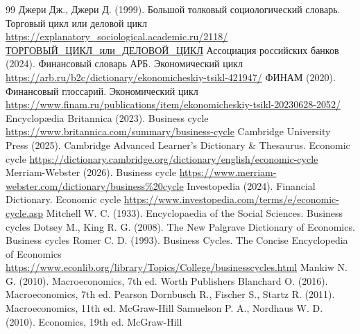 
\begin{RaggedRight}
\begin{thebibliography}{99} %
     \hypertarget{bib:Джери-1999}{} Джери Дж., Джери Д. (1999). Большой толковый социологический словарь. Торговый цикл или деловой цикл \url{https://explanatory_sociological.academic.ru/2118/ТОРГОВЫЙ_ЦИКЛ_или_ДЕЛОВОЙ_ЦИКЛ}
     \hypertarget{bib:АРБ-2024}{} Ассоциация российских банков (2024). Финансовый словарь АРБ. Экономический цикл \url{https://arb.ru/b2c/dictionary/ekonomicheskiy-tsikl-421947/}
     \hypertarget{bib:ФИНАМ-2020}{} ФИНАМ (2020). Финансовый глоссарий. Экономический цикл \url{https://www.finam.ru/publications/item/ekonomicheskiy-tsikl-20230628-2052/}
     \hypertarget{bib:Britannica-2023}{} Encyclopædia Britannica (2023). Business cycle \url{https://www.britannica.com/summary/business-cycle}
     \hypertarget{bib:Cambridge-2025}{} Cambridge University Press (2025). Cambridge Advanced Learner’s Dictionary \& Thesaurus. Economic cycle \url{https://dictionary.cambridge.org/dictionary/english/economic-cycle}
     \hypertarget{bib:Merriam-Webster-2026}{} Merriam-Webster (2026). Business cycle \url{https://www.merriam-webster.com/dictionary/business%20cycle}
     \hypertarget{bib:Investopedia-2024}{} Investopedia (2024). Financial Dictionary. Economic cycle \url{https://www.investopedia.com/terms/e/economic-cycle.asp}
     \hypertarget{bib:Mitchell-1933}{} Mitchell W. C. (1933). Encyclopaedia of the Social Sciences. Business cycles
     \hypertarget{bib:Dotsey-2008}{} Dotsey M., King R. G. (2008). The New Palgrave Dictionary of Economics. Business cycles
     \hypertarget{bib:Romer-1993}{} Romer C. D. (1993). Business Cycles. The Concise Encyclopedia of Economics \url{https://www.econlib.org/library/Topics/College/businesscycles.html}
     \hypertarget{bib:Mankiw-2010}{} Mankiw N. G. (2010). Macroeconomics, 7th ed. Worth Publishers
     \hypertarget{bib:Blanchard-2016}{} Blanchard O. (2016). Macroeconomics, 7th ed. Pearson
     \hypertarget{bib:Dornbusch-2011}{} Dornbusch R., Fischer S., Startz R. (2011). Macroeconomics, 11th ed. McGraw-Hill
     \hypertarget{bib:Samuelson-2010}{} Samuelson P. A., Nordhaus W. D. (2010). Economics, 19th ed. McGraw-Hill

\end{thebibliography}
\end{RaggedRight}
